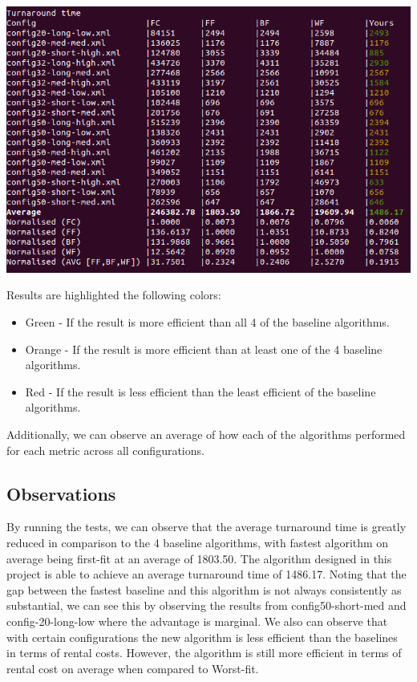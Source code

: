 \documentclass[a4paper]{article}
\begin{document}
\begin{center}
    \includegraphics[scale=0.35]{images/simulation-result.png}
\end{center}

Results are highlighted the following colors:
\begin{itemize}
  \item Green - If the result is more efficient than all 4 of the baseline algorithms.
  \item Orange - If the result is more efficient than at least one of the 4 baseline algorithms.
  \item Red - If the result is less efficient than the least efficient of the baseline algorithms.
\end{itemize}

Additionally, we can observe an average of how each of the algorithms performed for each metric across all configurations.

\subsection{Observations}
By running the tests, we can observe that the average turnaround time is greatly reduced in comparison to the 4 baseline algorithms, with fastest algorithm on average being first-fit at an average of 1803.50. The algorithm designed in this project is able to achieve an average turnaround time of 1486.17. Noting that the gap between the fastest baseline and this algorithm is not always consistently as substantial, we can see this by observing the results from config50-short-med and config-20-long-low where the advantage is marginal. We also can observe that with certain configurations the new algorithm is less efficient than the baselines in terms of rental costs. However, the algorithm is still more efficient in terms of rental cost on average when compared to Worst-fit.
\end{document}
